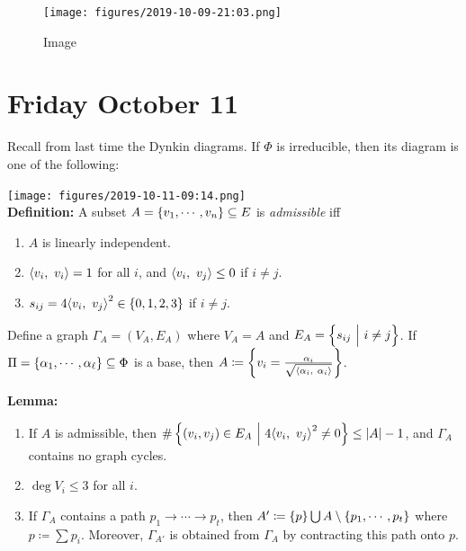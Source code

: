 \begin{figure}
\centering
\texttt{[image: figures/2019-10-09-21:03.png]}
\caption{Image}
\end{figure}

\hypertarget{friday-october-11}{%
\section{Friday October 11}\label{friday-october-11}}

Recall from last time the Dynkin diagrams. If \(\Phi\) is irreducible,
then its diagram is one of the following:

\texttt{[image: figures/2019-10-11-09:14.png]}\\

\textbf{Definition:} A subset
\(A = \left\{{v_1, \cdots, v_n}\right\} \subseteq E\) is \emph{admissible} iff

\begin{enumerate}
\def\labelenumi{\arabic{enumi}.}
\tightlist
\item
  \(A\) is linearly independent.
\item
  \({\left\langle {v_i},~{v_i} \right\rangle} = 1\) for all \(i\), and
  \({\left\langle {v_i},~{v_j} \right\rangle} \leq 0\) if \(i\neq j\).
\item
  \(s_{ij} = 4{\left\langle {v_i},~{v_j} \right\rangle}^2 \in \left\{{0,1,2,3}\right\}\) if \(i\neq j\).
\end{enumerate}

Define a graph \(\Gamma_A = (V_A, E_A)\) where \(V_A = A\) and
\(E_A= \left\{{s_{ij} {~\mathrel{\Big|}~} i\neq j}\right\}\). If
\(\Pi = \left\{{\alpha_1, \cdots, \alpha_\ell}\right\} \subseteq \Phi\) is a
base, then
\(A \coloneqq \left\{{v_i = \frac{\alpha_i}{\sqrt{{\left\langle {\alpha_i},~{\alpha_i} \right\rangle}}}}\right\}\).

\textbf{Lemma:}

\begin{enumerate}
\def\labelenumi{\alph{enumi}.}
\tightlist
\item
  If \(A\) is admissible, then
  \(\# \left\{{(v_i, v_j) \in E_A {~\mathrel{\Big|}~} 4{\left\langle {v_i},~{v_j} \right\rangle}^2 \neq 0}\right\} \leq {\left\lvert {A} \right\rvert} - 1\),
  and \(\Gamma_A\) contains no graph cycles.
\item
  \(\deg V_i \leq 3\) for all \(i\).
\item
  If \(\Gamma_A\) contains a path \(p_1 \to \cdots \to p_t\), then
  \(A' \coloneqq \left\{{p}\right\} \bigcup A\setminus \left\{{p_1, \cdots, p_t}\right\}\)
  where \(p \coloneqq \sum p_i\). Moreover, \(\Gamma_{A'}\) is obtained
  from \(\Gamma_A\) by contracting this path onto \(p\).
\end{enumerate}

